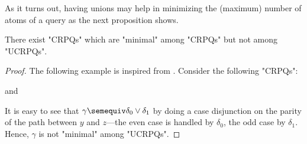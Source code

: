 As it turns out, having unions may help in minimizing the (maximum) number of atoms of a query as the next proposition shows.
\begin{proposition}
	\AP\label{prop:unionsmatter}
	There exist "CRPQs" which are "minimal" among "CRPQs" but not among "UCRPQs".
\end{proposition}
\begin{proof}
	The following example is inspired from \cite[Example 1.2]{FigueiraMorvan2025SemanticTreeWidthLMCS}.
	Consider the following "CRPQs":\leavevmode
	\begin{center}
		\small
		\hspace{.4cm}
		\hspace{.2cm}and\hspace{.2cm}
	\end{center}
	It is easy to see that $\gamma \semequiv \delta_0 \lor \delta_1$ 
	by doing a case disjunction on the parity of the path between $y$ and $z$---the even case
	is handled by $\delta_0$, the odd case by $\delta_1$.
	Hence, $\gamma$ is not "minimal" among "UCRPQs".
	

\end{proof}
